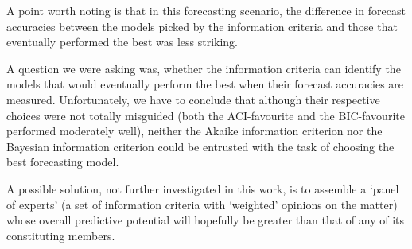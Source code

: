 A point worth noting is that in this forecasting scenario, the difference in forecast accuracies between the models picked by the information criteria and those that eventually performed the best was less striking.

A question we were asking was, whether the information criteria can identify the models that would eventually perform the best when their forecast accuracies are measured. Unfortunately, we have to conclude that although their respective choices were not totally misguided (both the ACI-favourite and the BIC-favourite performed moderately well), neither the Akaike information criterion nor the Bayesian information criterion could be entrusted with the task of choosing the best forecasting model.

A possible solution, not further investigated in this work, is to assemble a `panel of experts' (a set of information criteria with `weighted' opinions on the matter) whose overall predictive potential will hopefully be greater than that of any of its constituting members. 